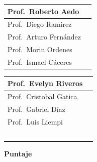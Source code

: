 \documentclass[addpoints,12pt]{exam}
\begin{document}
\vspace{0.15cm}
\noindent
\begin{minipage}{0.49\textwidth}
\begin{tabular}{|l|p{1.1cm}|}
\hline
Prof.\ Roberto Aedo & \\ \hline
Prof.\ Diego Ramirez & \\ \hline
Prof.\ Arturo Fern\'andez & \\ \hline
Prof.\ Morin Ordenes & \\ \hline
Prof.\ Ismael C\'aceres & \\ \hline
\end{tabular}
\end{minipage}%
\begin{minipage}{0.49\textwidth}
\begin{tabular}{|l|p{1.1cm}|}
\hline
Prof.\ Evelyn Riveros & \\ \hline
Prof.\ Cristobal Gatica & \\ \hline
Prof.\ Gabriel D\'iaz & \\ \hline
Prof.\ Luis Liempi & \\ \hline
~ & \\ \hline
\end{tabular}
\end{minipage}

\vspace{0.9cm}
\begin{center}
{\large\textbf{Puntaje}}\\[0.2cm]
\gradetable[v][questions]
\end{center}

\newpage
\end{document}
